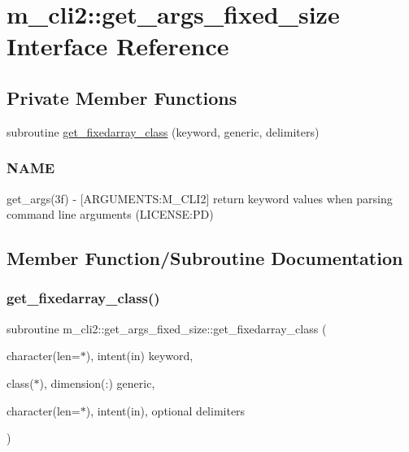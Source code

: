 \hypertarget{interfacem__cli2_1_1get__args__fixed__size}{}\section{m\+\_\+cli2\+:\+:get\+\_\+args\+\_\+fixed\+\_\+size Interface Reference}
\label{interfacem__cli2_1_1get__args__fixed__size}
\subsection*{Private Member Functions}
\begin{DoxyCompactItemize}
\item 
subroutine \mbox{\hyperlink{interfacem__cli2_1_1get__args__fixed__size_a93e683afd3e70009ae1a584df4268c3f}{get\+\_\+fixedarray\+\_\+class}} (keyword, generic, delimiters)
\begin{DoxyCompactList}\small\item\em \subsubsection*{N\+A\+ME}

get\+\_\+args(3f) -\/ \mbox{[}A\+R\+G\+U\+M\+E\+N\+TS\+:M\+\_\+\+C\+L\+I2\mbox{]} return keyword values when parsing command line arguments (L\+I\+C\+E\+N\+SE\+:PD) \end{DoxyCompactList}\end{DoxyCompactItemize}


\subsection{Member Function/\+Subroutine Documentation}
\mbox{\label{interfacem__cli2_1_1get__args__fixed__size_a93e683afd3e70009ae1a584df4268c3f}} 
\subsubsection{\texorpdfstring{get\+\_\+fixedarray\+\_\+class()}{get\_fixedarray\_class()}}
{\footnotesize\ttfamily subroutine m\+\_\+cli2\+::get\+\_\+args\+\_\+fixed\+\_\+size\+::get\+\_\+fixedarray\+\_\+class (\begin{DoxyParamCaption}\item[{character(len=$\ast$), intent(in)}]{keyword,  }\item[{class($\ast$), dimension(\+:)}]{generic,  }\item[{character(len=$\ast$), intent(in), optional}]{delimiters }\end{DoxyParamCaption})\hspace{0.3cm}{\ttfamily [private]}}



